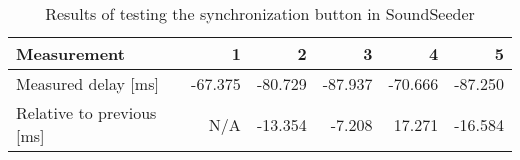\begin{table}[h]
\centering
\begin{tabular}{|l|r|r|r|r|r|}
\hline
Measurement          		& 1       & 2       & 3       & 4       & 5       \\ \hline
Measured delay [ms]       	& -67.375 & -80.729 & -87.937 & -70.666 & -87.250 \\ \hline
Relative to previous [ms] 	& N/A     & -13.354 & -7.208  & 17.271  & -16.584  \\ \hline
\end{tabular}
\caption{Results of testing the synchronization button in SoundSeeder}
\label{fig:soundseedersyncbutton}
\end{table}
